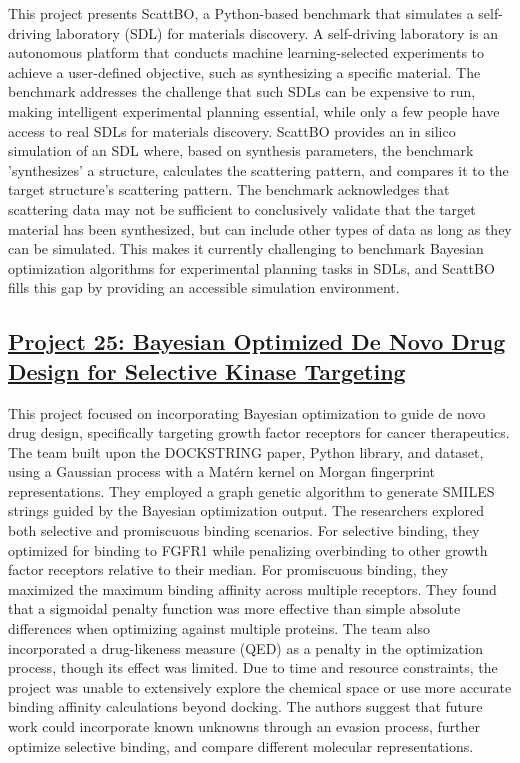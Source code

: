 This project presents ScattBO, a Python-based benchmark that simulates a self-driving laboratory (SDL) for materials discovery. A self-driving laboratory is an autonomous platform that conducts machine learning-selected experiments to achieve a user-defined objective, such as synthesizing a specific material\cite{szymanski_autonomous_2023}. The benchmark addresses the challenge that such SDLs can be expensive to run, making intelligent experimental planning essential, while only a few people have access to real SDLs for materials discovery. ScattBO provides an in silico simulation of an SDL where, based on synthesis parameters, the benchmark 'synthesizes' a structure, calculates the scattering pattern\cite{johansen_gpu-accelerated_2024}, and compares it to the target structure's scattering pattern. The benchmark acknowledges that scattering data may not be sufficient to conclusively validate that the target material has been synthesized\cite{leeman_challenges_2024}, but can include other types of data as long as they can be simulated. This makes it currently challenging to benchmark Bayesian optimization algorithms for experimental planning tasks in SDLs, and ScattBO fills this gap by providing an accessible simulation environment.
 \subsection*{\href{https://www.youtube.com/watch?v=nVtTYXxG7i4}{Project 25: Bayesian Optimized De Novo Drug Design for Selective Kinase Targeting }}

This project focused on incorporating Bayesian optimization to guide de novo drug design, specifically targeting growth factor receptors for cancer therapeutics. The team built upon the DOCKSTRING paper, Python library, and dataset\cite{garcia_dockstring_2022}, using a Gaussian process with a Matérn kernel on Morgan fingerprint representations. They employed a graph genetic algorithm to generate SMILES strings guided by the Bayesian optimization output. The researchers explored both selective and promiscuous binding scenarios. For selective binding, they optimized for binding to FGFR1 while penalizing overbinding to other growth factor receptors relative to their median. For promiscuous binding, they maximized the maximum binding affinity across multiple receptors. They found that a sigmoidal penalty function was more effective than simple absolute differences when optimizing against multiple proteins. The team also incorporated a drug-likeness measure (QED)\cite{bickerton_quantifying_2012} as a penalty in the optimization process, though its effect was limited. Due to time and resource constraints, the project was unable to extensively explore the chemical space or use more accurate binding affinity calculations beyond docking. The authors suggest that future work could incorporate known unknowns through an evasion process, further optimize selective binding, and compare different molecular representations.
